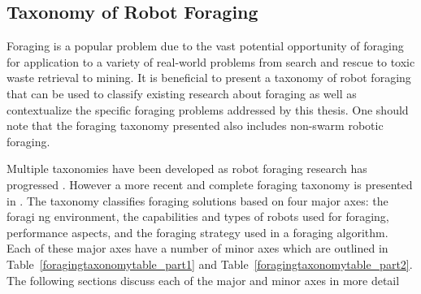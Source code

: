 \subsection{Taxonomy of Robot Foraging}
\label{sec:second:taxonomy}

Foraging is a popular problem due to the vast potential opportunity of foraging for application to a variety of real-world problems from search and rescue \cite{jennings1997cooperative} to toxic waste retrieval to mining. It is beneficial to present a taxonomy of robot foraging that can be used to classify existing research about foraging as well as contextualize the specific foraging problems addressed by this thesis. One should note that the foraging taxonomy presented also includes non-swarm robotic foraging.

Multiple taxonomies have been developed as robot foraging research has progressed \cite{oster1978caste,ostergaard2001emergent}. However a more recent and complete foraging taxonomy is presented in \cite{winfield2009foraging}. The taxonomy classifies foraging solutions based on four major axes: the foragi ng environment, the capabilities and types of robots used for foraging, performance aspects, and the foraging strategy used in a foraging algorithm. Each of these major axes have a number of minor axes which are outlined in Table~\ref{foragingtaxonomytable_part1} and Table~\ref{foragingtaxonomytable_part2}.  The following sections discuss each of the major and minor axes in more detail

